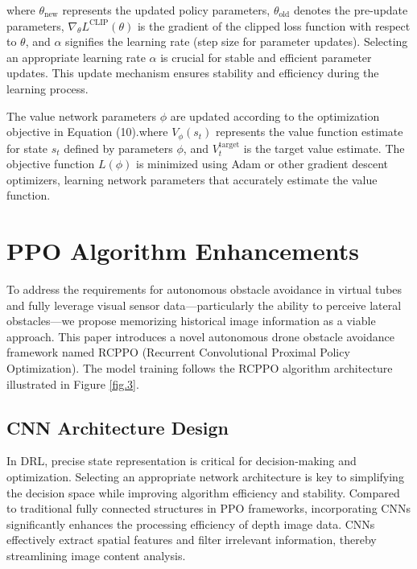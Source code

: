 \documentclass[preprint,12pt,authoryear]{elsarticle}
\begin{document}
where \( \theta_{\text{new}} \) represents the updated policy parameters, \( \theta_{\text{old}} \) denotes the pre-update parameters, \( \nabla_\theta L^{\text{CLIP}}(\theta) \) is the gradient of the clipped loss function with respect to \( \theta \), and \( \alpha \) signifies the learning rate (step size for parameter updates). Selecting an appropriate learning rate \( \alpha \) is crucial for stable and efficient parameter updates. This update mechanism ensures stability and efficiency during the learning process.


The value network parameters \( \phi \) are updated according to the optimization objective in Equation (10).where \( V_\phi(s_t) \) represents the value function estimate for state \( s_t \) defined by parameters \( \phi \), and \( V_t^{\text{target}} \) is the target value estimate. The objective function \( L(\phi) \) is minimized using Adam or other gradient descent optimizers, learning network parameters that accurately estimate the value function.

\section{PPO Algorithm Enhancements}

To address the requirements for autonomous obstacle avoidance in virtual tubes and fully leverage visual sensor data—particularly the ability to perceive lateral obstacles—we propose memorizing historical image information as a viable approach. This paper introduces a novel autonomous drone obstacle avoidance framework named RCPPO (Recurrent Convolutional Proximal Policy Optimization). The model training follows the RCPPO algorithm architecture illustrated in Figure \ref{fig.3}.


\subsection{CNN Architecture Design}

In DRL, precise state representation is critical for decision-making and optimization. Selecting an appropriate network architecture is key to simplifying the decision space while improving algorithm efficiency and stability. Compared to traditional fully connected structures in PPO frameworks, incorporating CNNs significantly enhances the processing efficiency of depth image data. CNNs effectively extract spatial features and filter irrelevant information, thereby streamlining image content analysis.
\end{document}
